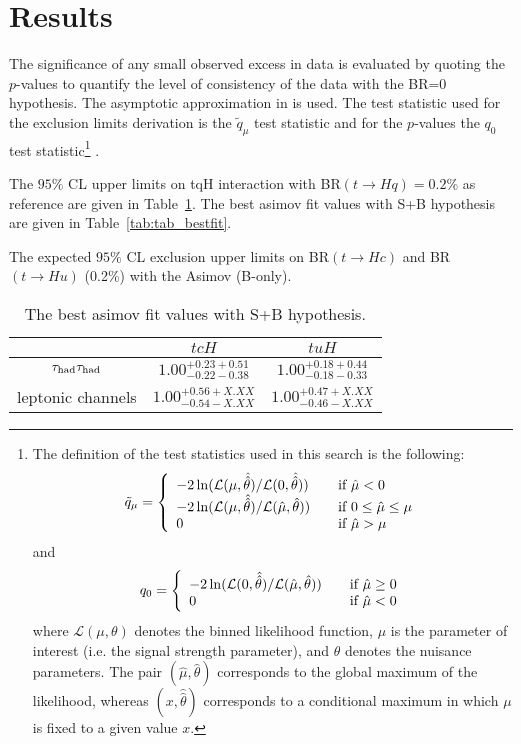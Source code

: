 \section{Results}
\label{sec:results}

The significance of any small observed excess in data is evaluated by quoting the $p$-values to quantify the level of consistency of the data with the BR=0 hypothesis. The asymptotic approximation in \cite{CCGV} is used. The test statistic used for the exclusion limits derivation is the $\tilde{q}_\mu$ test statistic
and for the $p$-values the $q_{0}$ test statistic\footnote{The definition of the test statistics used in this search is the following:
\[ \tilde q_\mu = \left\{
  \begin{array}{l l}
    -2 \ln (\mathcal{L}(\mu,\hat{\hat{\theta}})/\mathcal{L}(0,\hat{\hat\theta})) & \quad \text{if $\hat\mu < 0$}\\
    -2 \ln (\mathcal{L}(\mu,\hat{\hat{\theta}})/\mathcal{L}(\hat \mu,\hat\theta)) & \quad \text{if $0 \leq \hat\mu \leq \mu$}\\
    0 & \quad \text{if $\hat\mu > \mu$}
  \end{array} \right.\]
and
\[ q_0 = \left\{
  \begin{array}{l l}
    -2 \ln (\mathcal{L}(0,\hat{\hat{\theta}})/\mathcal{L}(\hat\mu,\hat\theta)) &\quad \text{if $\hat\mu \geq 0$}\\
    0 & \quad \text{if $\hat\mu <0$}
  \end{array} \right.\]
where $\mathcal L(\mu,\theta)$ denotes the binned likelihood function, $\mu$ is the parameter of interest (i.e.
the signal strength parameter), and $\theta$ denotes the nuisance parameters. The pair $(\hat\mu, \hat\theta)$
corresponds to the global maximum of the likelihood, whereas $(x, \hat{\hat\theta})$ corresponds to a conditional
maximum in which $\mu$ is fixed to a given value $x$.
}
\cite{CCGV}.

The $95\%$ CL upper limits on tqH interaction with BR$(t\to Hq)=0.2\%$ as reference are given in Table~\ref{tab:tab_limit}. The best asimov fit values with S+B hypothesis are given in Table~\ref{tab:tab_bestfit}.

\begin{table}[htb]
\caption{ The expected $95\%$ CL exclusion upper limits on BR$(t\to Hc)$ and BR$(t\to Hu)$ (0.2\%) with the Asimov (B-only).}

\label{tab:tab_limit}
\end{table}

\begin{table}[htb]
\caption{ The best asimov fit values with S+B hypothesis. }
\centering
\begin{tabular}{|c|c|c|} \hline
  & $tcH$ & $tuH$ \\ \hline
  $\tau_\text{had}{}\tau_\text{had}$ & $1.00^{+0.23 +0.51}_{-0.22 -0.38}$ & $1.00^{+0.18 +0.44}_{-0.18 -0.33}$ \\ \hline
  leptonic channels & $1.00^{+0.56 +X.XX}_{-0.54 -X.XX}$ & $1.00^{+0.47 +X.XX}_{-0.46 -X.XX}$ \\ \hline

\end{tabular}
\label{tab:tab_limit}
\end{table}

